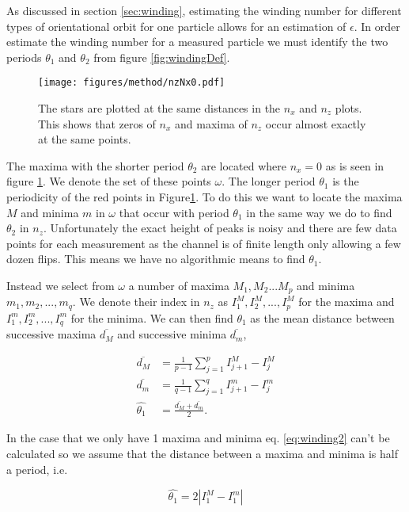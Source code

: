 	\label{sec:windingEstimation}
As discussed in section \ref{sec:winding}, estimating the winding number for different types of orientational orbit for one particle allows for an estimation of $\epsilon$. In order estimate the winding number for a measured 
particle we must identify the two periods $\theta_1$ and $\theta_2$ from figure \ref{fig:windingDef}. 


\begin{figure}
\centering
\texttt{[image: figures/method/nzNx0.pdf]}
\caption{The stars are plotted at the same distances in the $n_x$ and $n_z$ plots. This shows that zeros of $n_x$ and maxima of $n_z$ occur almost exactly at the same points.}
\label{fig:nzNx0}
\end{figure}

The maxima with the shorter period $\theta_2$ are located where $n_x = 0$ as is seen in figure \ref{fig:nzNx0}. We denote the set of these points $\omega$. The longer period $\theta_1$ is the periodicity of the red points in Figure\ref{fig:nzNx0}. To do this we want to locate the maxima $M$ and minima $m$ in $\omega$ that occur with period $\theta_1$ in the same way we do to find $\theta_2$ in $n_z$. Unfortunately the exact height of peaks is noisy and there are few data points for each measurement as the channel is of finite length only allowing a few dozen flips.
This means we have no algorithmic means to find $\theta_1$. 

Instead we select from $\omega$ a number of maxima $M_1, M_2 ... M_p$ and minima $m_1, m_2, ..., m_q$. We denote their index in $n_z$ as $I^M_1, I^M_2, 
..., I^M_p$ for the maxima and $I^m_1, I^m_2, ..., I^m_q$ for the minima. We can then find $\theta_1$ as the mean distance between successive maxima $\overline{d_M}$ and successive minima $\overline{d_m}$, 

\begin{align}
\overline{d_M} &= \frac{1}{p-1} \sum\limits_{j=1}^{p} I^M_{j+1} - I^M_{j} \\
\overline{d_m} &= \frac{1}{q-1} \sum\limits_{j=1}^{q} I^m_{j+1}- I^m_{j}\\
\hat{\theta_1}   &= \frac{\overline{d_M} + \overline{d_m}}{2}.
\label{eq:winding2}
\end{align}

In the case that we only have 1 maxima and minima eq. \ref{eq:winding2} can't be calculated so we assume that the distance between a maxima and minima is half a period, i.e.

\begin{equation}
\hat{\theta_1} = 2\left| I^M_1 - I^m_1 \right|
\end{equation}